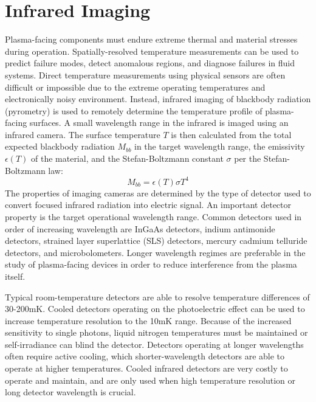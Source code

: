 \documentclass{jpp}
\begin{document}
\section{Infrared Imaging}

Plasma-facing components must endure extreme thermal and material stresses during operation. Spatially-resolved temperature measurements can be used to predict failure modes, detect anomalous regions, and diagnose failures in fluid systems. Direct temperature measurements using physical sensors are often difficult or impossible due to the extreme operating temperatures and electronically noisy environment. Instead, infrared imaging of blackbody radiation (pyrometry) is used to remotely determine the temperature profile of plasma-facing surfaces. A small wavelength range in the infrared is imaged using an infrared camera. The surface temperature $T$ is then calculated from the total expected blackbody radiation $M_{bb}$ in the target wavelength range, the emissivity $\epsilon(T)$ of the material, and the Stefan-Boltzmann constant $\sigma$ per the Stefan-Boltzmann law:
\begin{equation*}
M_{bb} = \epsilon(T) \sigma T^4
\end{equation*}
The properties of imaging cameras are determined by the type of detector used to convert focused infrared radiation into electric signal. An important detector property is the target operational wavelength range. Common detectors used in order of increasing wavelength are InGaAs detectors, indium antimonide detectors, strained layer superlattice (SLS) detectors, mercury cadmium telluride detectors, and microbolometers. Longer wavelength regimes are preferable in the study of plasma-facing devices in order to reduce interference from the plasma itself.

Typical room-temperature detectors are able to resolve temperature differences of 30-200mK. Cooled detectors operating on the photoelectric effect can be used to increase temperature resolution to the 10mK range. Because of the increased sensitivity to single photons, liquid nitrogen temperatures must be maintained or self-irradiance can blind the detector. Detectors operating at longer wavelengths often require active cooling, which shorter-wavelength detectors are able to operate at higher temperatures. Cooled infrared detectors are very costly to operate and maintain, and are only used when high temperature resolution or long detector wavelength is crucial.
\end{document}
